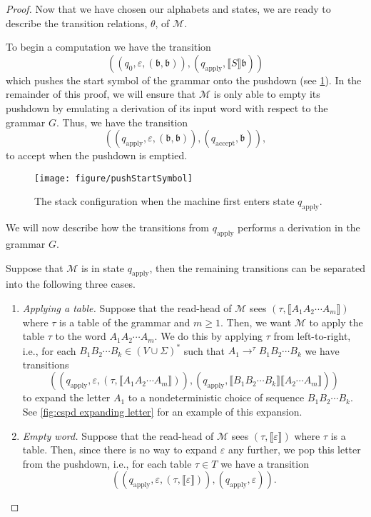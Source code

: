 \begin{proof}
	Now that we have chosen our alphabets and states, we are ready to describe the transition relations, $\theta$, of $\mathcal{M}$.
	
	To begin a computation we have the transition
	\[
	(
	(q_0,\varepsilon,(\mathfrak{b},\mathfrak{b})),
	(q_\mathrm{apply}, \llbracket S \rrbracket \mathfrak{b})
	)
	\]
	which pushes the start symbol of the grammar onto the pushdown (see \cref{fig:machine beginning}).
	In the remainder of this proof, we will ensure that $\mathcal{M}$ is only able to empty its pushdown by emulating a derivation of its input word with respect to the grammar $G$.
	Thus, we have the transition
	\[
	(
	(q_\mathrm{apply},\varepsilon,(\mathfrak{b},\mathfrak{b})),
	(q_\mathrm{accept},\mathfrak{b})
	),
	\]
	to accept when the pushdown is emptied.
	
	\begin{figure}[!ht]
		\centering
		\texttt{[image: figure/pushStartSymbol]}
		\caption{The stack configuration when the machine first enters state $q_\mathrm{apply}$.}%
		\label{fig:machine beginning}
	\end{figure}
	
	We will now describe how the transitions from $q_\mathrm{apply}$ performs a derivation in the grammar $G$.
	
	Suppose that $\mathcal{M}$ is in state $q_\mathrm{apply}$, then the remaining transitions can be separated into the following three cases.
	
	\begin{enumerate}
		\item \textit{Applying a table.}
		Suppose that the read-head of $\mathcal{M}$ sees
		$(\tau, \llbracket A_1 A_2 \cdots A_m \rrbracket)$
		where $\tau$ is a table of the grammar and $m \geq 1$.
		Then, we want $\mathcal{M}$ to apply the table $\tau$ to the word $A_1 A_2 \cdots A_m$.
		We do this by applying $\tau$ from left-to-right, i.e., for each $B_1 B_2 \cdots B_k \in (V \cup \Sigma)^*$ such that $A_1 \to^\tau B_1 B_2 \cdots B_k$ we have transitions
		\[
		(
		(q_\mathrm{apply}, \varepsilon, (\tau, \llbracket A_1 A_2 \cdots A_m \rrbracket)),
		(q_\mathrm{apply},
		\llbracket B_1 B_2 \cdots B_k \rrbracket
		\llbracket A_2 \cdots A_m \rrbracket
		)
		)
		\]
		to expand the letter $A_1$ to a nondeterministic choice of sequence $B_1 B_2 \cdots B_k$.
		See \cref{fig:cspd expanding letter} for an example of this expansion.
		
		\item \textit{Empty word.}
		Suppose that the read-head of $\mathcal{M}$ sees
		$(\tau, \llbracket \varepsilon \rrbracket)$
		where $\tau$ is a table.
		Then, since there is no way to expand $\varepsilon$ any further, we pop this letter from the pushdown, i.e., for each table $\tau \in T$ we have a transition
		\[
		(
		(q_\mathrm{apply}, \varepsilon, (\tau, \llbracket \varepsilon \rrbracket)),
		(q_\mathrm{apply}, \varepsilon)
		).
		\]
		

\end{enumerate}
\end{proof}

